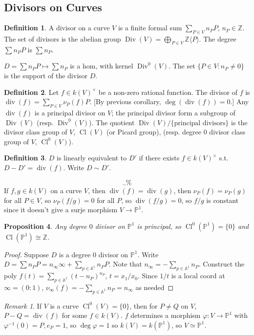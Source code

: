 \documentclass{article}
\theoremstyle{definition}
\newtheorem{defn}{Definition}[section]
\theoremstyle{remark}
\newtheorem{rem}{Remark}
\theoremstyle{plain}
\newtheorem{prop}[defn]{Proposition}
\newcommand{\ZZ}{\mathbb{Z}}
\newcommand{\PP}{\mathbb{P}}
\newcommand{\bA}{\mathbb{A}}
\newcommand{\cl}{\operatorname{Cl}}
\begin{document}
\subsection{Divisors on Curves}
\begin{defn}
    A divisor on a curve $V$ is a finite formal sum $\sum_{P\in V}n_PP$, $n_P\in\ZZ$. The set of divisors is the abelian group $\operatorname{Div}(V)=\bigoplus_{P\in V}\ZZ\langle P\rangle$. The degree $\sum n_PP$ is $\sum n_P$. 
\end{defn}
$D=\sum n_PP\mapsto \sum n_P$ is a hom, with kernel $\operatorname{Div}^0(V)$. The set $\{P\in V:n_P\neq 0\}$ is the support of the divisor $D$.
\begin{defn}
    Let $f\in k(V)^\times$ be a non-zero rational function. The divisor of $f$ is $\operatorname{div}(f)=\sum_{P\in V}\nu_P(f)P$. [By previous corollary, $\deg(\operatorname{div}(f))=0$.] Any $\operatorname{div}(f)$ is a principal divisor on $V$; the principal divisor form a subgroup of $\operatorname{Div}(V)$ (resp. $\operatorname{Div}^0(V)$). The quotient $\operatorname{Div}(V)/\{\text{principal divisors}\}$ is the divisor class group of $V$, $\cl(V)$ (or Picard group), (resp. degree $0$ divisor class group of $V$, $\cl^0(V)$). 
\end{defn}
\begin{defn}
    $D$ is linearly equivalent to $D'$ if there exists $f\in k(V)^\times$ s.t. $D-D'=\operatorname{div}(f)$. Write $D\sim D'$.
\end{defn}
\[{}_\neg\%\tag{Owen's Signature}\]
If $f,g\in k(V)$ on a curve $V$, then $\operatorname{div}(f)=\operatorname{div}(g)$, then $\nu_P(f)=\nu_P(g)$ for all $P\in V$, so $\nu_P(f/g)=0$ for all $P$, so $\operatorname{div}(f/g)=0$, so $f/g$ is constant since it doesn't give a surje morphism $V\to\PP^1$.
\begin{prop}
    Any degree $0$ divisor on $\PP^1$ is principal, so $\cl^0(\PP^1)=\{0\}$ and $\cl(\PP^1)\cong\ZZ$.
\end{prop}
\begin{proof}
    Suppose $D$ is a degree $0$ divisor on $\PP^1$. Write $D=\sum n_PP=n_\infty\infty+\sum_{p\in\bA^1}n_PP$. Note that $n_\infty=-\sum_{p\in\bA^1}n_P$. Construct the poly $f(t)=\sum_{p\in\bA^1}(t-n_P)^{n_P}$, $t=x_1/x_0$. Since $1/t$ is a local coord at $\infty=(0:1)$, $\nu_\infty(f)=-\sum_{p\in\bA^1}n_P=n_\infty$ as needed
\end{proof}
\begin{rem}
    If $V$ is a curve $\cl^0(V)=\{0\}$, then for $P\neq Q$ on $V$, $P-Q=\operatorname{div}(f)$ for some $f\in k(V)$. $f$ determines a morphism $\varphi:V\to\PP^1$ with $\varphi^{-1}(0)=P,e_P=1$, so $\deg\varphi=1$ so $k(V)=k(\PP^1)$, so $V\simeq\PP^1$.
\end{rem}
\end{document}
